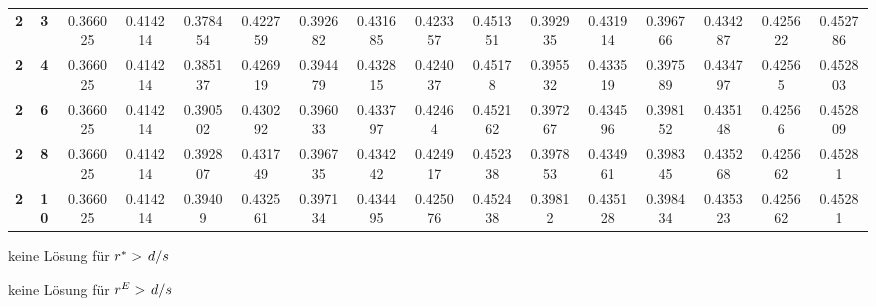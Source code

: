 \begin{sidewaystable}[!p]
\begin{threeparttable}
\begin{tabular}{>{\bfseries}c>{\bfseries}cSSSSSSSSSSSSSS}
			2   & 3    & 0.366025   & 0.414214 & 0.378454                 & 0.422759                    & 0.392682   & 0.431685 & 0.423357   & 0.451351 & 0.392935                 & 0.431914 & 0.396766   & 0.434287 & 0.425622   & 0.452786 \\
			2   & 4    & 0.366025   & 0.414214 & 0.385137                 & 0.426919                    & 0.394479   & 0.432815 & 0.424037   & 0.45178  & 0.395532                 & 0.433519 & 0.397589   & 0.434797 & 0.42565    & 0.452803 \\
			2   & 6    & 0.366025   & 0.414214 & 0.390502                 & 0.430292                    & 0.396033   & 0.433797 & 0.42464    & 0.452162 & 0.397267                 & 0.434596 & 0.398152   & 0.435148 & 0.42566    & 0.452809 \\
			2   & 8    & 0.366025   & 0.414214 & 0.392807                 & 0.431749                    & 0.396735   & 0.434242 & 0.424917   & 0.452338 & 0.397853                 & 0.434961 & 0.398345   & 0.435268 & 0.425662   & 0.45281  \\
			2   & 10   & 0.366025   & 0.414214 & 0.39409                  & 0.432561                    & 0.397134   & 0.434495 & 0.425076   & 0.452438 & 0.39812                  & 0.435128 & 0.398434   & 0.435323 & 0.425662   & 0.45281  \\ \bottomrule
		\end{tabular}
		\begin{tablenotes}[para]
			\item[\textdagger] keine Lösung für $r^\ast > \flatfrac{d}{s}$
			\item[\textdaggerdbl] keine Lösung für $r^E > \flatfrac{d}{s}$
		\end{tablenotes}
	\end{threeparttable}
\end{sidewaystable}

